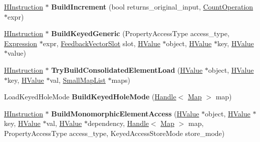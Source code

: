 \begin{DoxyCompactItemize}
\item 
\hyperlink{classv8_1_1internal_1_1_h_instruction}{H\+Instruction} $\ast$ {\bfseries Build\+Increment} (bool returns\+\_\+original\+\_\+input, \hyperlink{classv8_1_1internal_1_1_count_operation}{Count\+Operation} $\ast$expr)\hypertarget{classv8_1_1internal_1_1_h_optimized_graph_builder_a15f08c02dad4b1bf37c6969d583d52f5}{}\label{classv8_1_1internal_1_1_h_optimized_graph_builder_a15f08c02dad4b1bf37c6969d583d52f5}

\item 
\hyperlink{classv8_1_1internal_1_1_h_instruction}{H\+Instruction} $\ast$ {\bfseries Build\+Keyed\+Generic} (Property\+Access\+Type access\+\_\+type, \hyperlink{classv8_1_1internal_1_1_expression}{Expression} $\ast$expr, \hyperlink{classv8_1_1internal_1_1_feedback_vector_slot}{Feedback\+Vector\+Slot} slot, \hyperlink{classv8_1_1internal_1_1_h_value}{H\+Value} $\ast$object, \hyperlink{classv8_1_1internal_1_1_h_value}{H\+Value} $\ast$key, \hyperlink{classv8_1_1internal_1_1_h_value}{H\+Value} $\ast$value)\hypertarget{classv8_1_1internal_1_1_h_optimized_graph_builder_aae42eb319bc8564cbcd9c440ca190f40}{}\label{classv8_1_1internal_1_1_h_optimized_graph_builder_aae42eb319bc8564cbcd9c440ca190f40}

\item 
\hyperlink{classv8_1_1internal_1_1_h_instruction}{H\+Instruction} $\ast$ {\bfseries Try\+Build\+Consolidated\+Element\+Load} (\hyperlink{classv8_1_1internal_1_1_h_value}{H\+Value} $\ast$object, \hyperlink{classv8_1_1internal_1_1_h_value}{H\+Value} $\ast$key, \hyperlink{classv8_1_1internal_1_1_h_value}{H\+Value} $\ast$val, \hyperlink{classv8_1_1internal_1_1_small_map_list}{Small\+Map\+List} $\ast$maps)\hypertarget{classv8_1_1internal_1_1_h_optimized_graph_builder_ab8be06c04eeb7452a199bd20722cedd5}{}\label{classv8_1_1internal_1_1_h_optimized_graph_builder_ab8be06c04eeb7452a199bd20722cedd5}

\item 
Load\+Keyed\+Hole\+Mode {\bfseries Build\+Keyed\+Hole\+Mode} (\hyperlink{classv8_1_1internal_1_1_handle}{Handle}$<$ \hyperlink{classv8_1_1internal_1_1_map}{Map} $>$ map)\hypertarget{classv8_1_1internal_1_1_h_optimized_graph_builder_aa67fe592584b3a030cc1c2f1d74c0477}{}\label{classv8_1_1internal_1_1_h_optimized_graph_builder_aa67fe592584b3a030cc1c2f1d74c0477}

\item 
\hyperlink{classv8_1_1internal_1_1_h_instruction}{H\+Instruction} $\ast$ {\bfseries Build\+Monomorphic\+Element\+Access} (\hyperlink{classv8_1_1internal_1_1_h_value}{H\+Value} $\ast$object, \hyperlink{classv8_1_1internal_1_1_h_value}{H\+Value} $\ast$key, \hyperlink{classv8_1_1internal_1_1_h_value}{H\+Value} $\ast$val, \hyperlink{classv8_1_1internal_1_1_h_value}{H\+Value} $\ast$dependency, \hyperlink{classv8_1_1internal_1_1_handle}{Handle}$<$ \hyperlink{classv8_1_1internal_1_1_map}{Map} $>$ map, Property\+Access\+Type access\+\_\+type, Keyed\+Access\+Store\+Mode store\+\_\+mode)\hypertarget{classv8_1_1internal_1_1_h_optimized_graph_builder_a9861b294fbdf00bfc5f0bf06e6f987cd}{}\label{classv8_1_1internal_1_1_h_optimized_graph_builder_a9861b294fbdf00bfc5f0bf06e6f987cd}


\end{DoxyCompactItemize}
